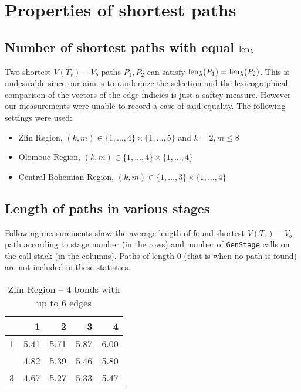 \section{Properties of shortest paths}

\subsection*{Number of shortest paths with equal $\operatorname{len}_\lambda$}

Two shortest $V(T_r){-}V_b$ paths $P_1, P_2$ can satisfy $\operatorname{len}_\lambda(P_1) = \operatorname{len}_\lambda(P_2)$. This is undesirable since our aim is to randomize the selection and the lexicographical comparison of the vectors of the edge indicies is just a saftey measure. However our measurements were unable to record a case of said equality. The following settings were used:

\begin{itemize}
	\item Zlín Region, $(k, m) \in \{1,\ldots,4\} \times \{1,\ldots,5\}$ and $k=2, m \leq 8$
	\item Olomouc Region, $(k, m) \in \{1,\ldots,4\} \times \{1,\ldots,4\}$
	\item Central Bohemian Region, $(k, m) \in \{1,\ldots,3\} \times \{1,\ldots,4\}$
\end{itemize}

\subsection*{Length of paths in various stages}

Following measurements show the average length of found shortest $V(T_r){-}V_b$ path according to stage number (in the rows) and number of \lstinline|GenStage| calls on the call stack (in the columns). Paths of length $0$ (that is when no path is found) are not included in these statistics.

\begin{table}[H]
	\caption{Zlín Region -- $4$-bonds with up to 6 edges}
	\centering
	\begin{tabular}{c|rrrr}
		\toprule
		        & 1    & 2    & 3  	 & 4	  \\ \hline
		1       & 5.41 & 5.71 & 5.87 & 6.00  \\
		\evenrowcolor
		2       & 4.82 & 5.39 & 5.46 & 5.80 \\
		3       & 4.67 & 5.27 & 5.33 & 5.47
	\end{tabular}
\end{table}

